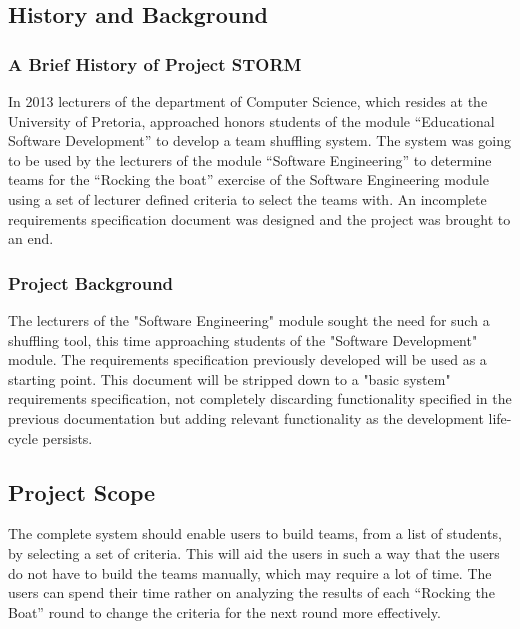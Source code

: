 \subsection{History and Background}
\subsubsection{A Brief History of Project STORM}
In 2013 lecturers of the department of Computer Science, which resides at the University of Pretoria,
approached honors students of the module “Educational Software Development” to develop a team
shuffling system. 
The system was going to be used by the lecturers of the module “Software Engineering” to
determine teams for the “Rocking the boat” exercise of the Software Engineering module using a
set of lecturer defined criteria to select the teams with. An incomplete requirements specification document
was designed and the project was brought to an end. 

\subsubsection{Project Background}
The lecturers of the "Software Engineering" module sought the need for such a shuffling tool, this
time approaching students of the "Software Development" module. The requirements specification previously 
developed will be used as a starting point. This document will be stripped down to a "basic system" requirements
specification, not completely discarding functionality specified in the previous documentation but adding relevant functionality
as the development life-cycle persists.

\subsection{Project Scope}
The complete system should enable users to build teams, from a list of students, by selecting a
set of criteria. This will aid the users in such a way that the users do not have to build the teams
manually, which may require a lot of time. The users can spend their time rather on analyzing
the results of each “Rocking the Boat” round to change the criteria for the next round more
effectively.
